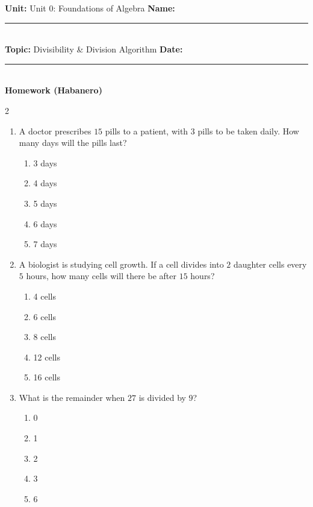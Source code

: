 \documentclass[10pt]{article}
\begin{document}
\enlargethispage{2.5cm}

\begin{tcolorbox}[colback=mainblue!5, colframe=mainblue, sharp corners, boxrule=0.5pt]
    \small \textbf{Unit:} Unit 0: Foundations of Algebra \hfill \textbf{Name:} \rule{3cm}{0.4pt} \\
    \small \textbf{Topic:} Divisibility & Division Algorithm \hfill \textbf{Date:} \rule{2cm}{0.4pt} \\
    \centering \textbf{\large Homework (Habanero)}
\end{tcolorbox}

\vspace{0.2cm}

\begin{multicols}{2}
\begin{enumerate}[label=\textbf{Q\arabic*.}, leftmargin=*, itemsep=6pt, parsep=0pt]

  \item \small A doctor prescribes $15$ pills to a patient, with $3$ pills to be taken daily. How many days will the pills last?
  \begin{enumerate}[label=(\Alph*), leftmargin=0.6cm, nosep, itemsep=2pt]
    \item 3 days
    \item 4 days
    \item 5 days
    \item 6 days
    \item 7 days
  \end{enumerate}

  \item \small A biologist is studying cell growth. If a cell divides into $2$ daughter cells every $5$ hours, how many cells will there be after $15$ hours?
  \begin{enumerate}[label=(\Alph*), leftmargin=0.6cm, nosep, itemsep=2pt]
    \item 4 cells
    \item 6 cells
    \item 8 cells
    \item 12 cells
    \item 16 cells
  \end{enumerate}

  \item \small What is the remainder when $27$ is divided by $9$?
  \begin{enumerate}[label=(\Alph*), leftmargin=0.6cm, nosep, itemsep=2pt]
    \item 0
    \item 1
    \item 2
    \item 3
    \item 6
  \end{enumerate}


\end{enumerate}
\end{multicols}
\end{document}
